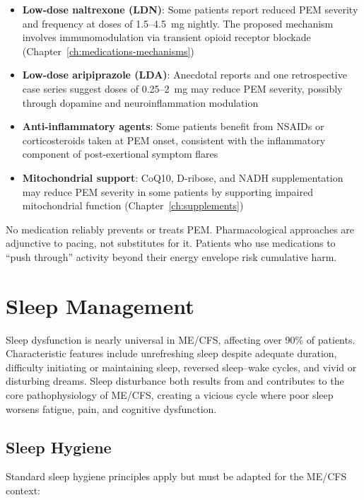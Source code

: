 \begin{itemize}
    \item \textbf{Low-dose naltrexone (LDN)}: Some patients report reduced PEM severity and frequency at doses of 1.5--4.5~mg nightly. The proposed mechanism involves immunomodulation via transient opioid receptor blockade (Chapter~\ref{ch:medications-mechanisms})
    \item \textbf{Low-dose aripiprazole (LDA)}: Anecdotal reports and one retrospective case series suggest doses of 0.25--2~mg may reduce PEM severity, possibly through dopamine and neuroinflammation modulation
    \item \textbf{Anti-inflammatory agents}: Some patients benefit from NSAIDs or corticosteroids taken at PEM onset, consistent with the inflammatory component of post-exertional symptom flares
    \item \textbf{Mitochondrial support}: CoQ10, D-ribose, and NADH supplementation may reduce PEM severity in some patients by supporting impaired mitochondrial function (Chapter~\ref{ch:supplements})
\end{itemize}

\begin{warning}
No medication reliably prevents or treats PEM. Pharmacological approaches are adjunctive to pacing, not substitutes for it. Patients who use medications to ``push through'' activity beyond their energy envelope risk cumulative harm.
\end{warning}

\section{Sleep Management}
\label{sec:sleep-management}

Sleep dysfunction is nearly universal in ME/CFS, affecting over 90\% of patients. Characteristic features include unrefreshing sleep despite adequate duration, difficulty initiating or maintaining sleep, reversed sleep--wake cycles, and vivid or disturbing dreams. Sleep disturbance both results from and contributes to the core pathophysiology of ME/CFS, creating a vicious cycle where poor sleep worsens fatigue, pain, and cognitive dysfunction.

\subsection{Sleep Hygiene}

Standard sleep hygiene principles apply but must be adapted for the ME/CFS context:

